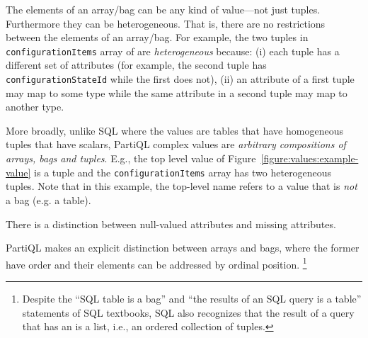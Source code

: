 \begin{compact_enum}
\item The elements of an array/bag can be any kind of value---not just tuples.
Furthermore they can be heterogeneous. That is, there are no restrictions
between the elements of an array/bag. For example, the two tuples in
\texttt{configurationItems} array of are \textit{heterogeneous} because: (i)
each tuple has a different set of attributes (for example, the second tuple has
\texttt{configurationStateId} while the first does not), (ii) an attribute of a
first tuple may map to some type while the same attribute in a second tuple may
map to another type.

\item More broadly, unlike SQL where the values are tables that have homogeneous
tuples that have scalars, PartiQL complex values are {\em arbitrary compositions
of arrays, bags and tuples}. E.g., the top level value of
Figure~\ref{figure:values:example-value} is a tuple and the
\texttt{configurationItems} array has two heterogeneous tuples. Note that in
this example, the top-level name refers to a value that is \textit{not} a bag
(e.g. a table).

\item There is a distinction between null-valued attributes and missing
attributes.



\item PartiQL makes an explicit distinction between arrays and bags, where the
former have order and their elements can be addressed by ordinal position.
\footnote{Despite the ``SQL table is a bag'' and ``the results of an SQL query
is a table'' statements of SQL textbooks, SQL also recognizes that the result of
a query that has an  is a list, i.e., an ordered collection of
tuples.}
\end{compact_enum}

